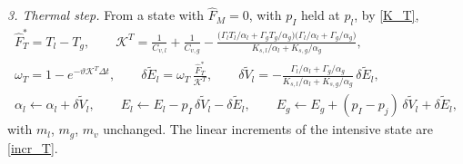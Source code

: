 \emph{3. Thermal step.} From a state with $\hat{F}_M=0$, with $p_I$ held at $p_l$, by \eqref{K_T},
\begin{equation}\label{alg_T}
\begin{gathered}
\hat{F}_T^*=T_l-T_g,\qquad \mathcal{K}^T=\frac1{C_{v,l}}+\frac1{C_{v,g}}-\frac{\bigl(\Gamma_lT_l/\alpha_l+\Gamma_gT_g/\alpha_g\bigr)\bigl(\Gamma_l/\alpha_l+\Gamma_g/\alpha_g\bigr)}{K_{s,l}/\alpha_l+K_{s,g}/\alpha_g},\\
\omega_T=1-e^{-\vartheta\mathcal{K}^T\Delta t},\qquad \delta\tilde{E}_l=\omega_T\,\frac{\hat{F}_T^*}{\mathcal{K}^T},\qquad \delta\tilde{V}_l=-\frac{\Gamma_l/\alpha_l+\Gamma_g/\alpha_g}{K_{s,l}/\alpha_l+K_{s,g}/\alpha_g}\,\delta\tilde{E}_l,\\
\alpha_l\leftarrow\alpha_l+\delta\tilde{V}_l,\qquad E_l\leftarrow E_l-p_I\,\delta\tilde{V}_l-\delta\tilde{E}_l,\qquad E_g\leftarrow E_g+(p_I-p_{j})\,\delta\tilde{V}_l+\delta\tilde{E}_l,
\end{gathered}
\end{equation}
with $m_l$, $m_g$, $m_v$ unchanged. The linear increments of the intensive state are \eqref{incr_T}.

